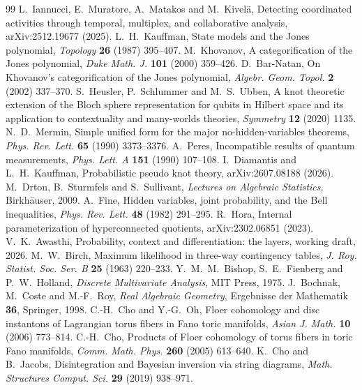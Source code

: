 \documentclass[11pt]{article}
\theoremstyle{definition}\newtheorem{definition}[theorem]{Definition}\newtheorem{remark}[theorem]{Remark}\newtheorem{example}[theorem]{Example}\newtheorem{problem}[theorem]{Open problem}\crefname{problem}{Problem}{Problems}
\begin{document}
\begin{thebibliography}{99}
 L.~Iannucci, E.~Muratore, A.~Matakos and M.~Kivel\"a, Detecting coordinated activities through temporal, multiplex, and collaborative analysis, arXiv:2512.19677 (2025).
 L.~H.~Kauffman, State models and the Jones polynomial, \emph{Topology} \textbf{26} (1987) 395--407.
 M.~Khovanov, A categorification of the Jones polynomial, \emph{Duke Math. J.} \textbf{101} (2000) 359--426.
 D.~Bar-Natan, On Khovanov's categorification of the Jones polynomial, \emph{Algebr. Geom. Topol.} \textbf{2} (2002) 337--370.
 S.~Heusler, P.~Schlummer and M.~S.~Ubben, A knot theoretic extension of the Bloch sphere representation for qubits in Hilbert space and its application to contextuality and many-worlds theories, \emph{Symmetry} \textbf{12} (2020) 1135.
 N.~D.~Mermin, Simple unified form for the major no-hidden-variables theorems, \emph{Phys. Rev. Lett.} \textbf{65} (1990) 3373--3376.
 A.~Peres, Incompatible results of quantum measurements, \emph{Phys. Lett. A} \textbf{151} (1990) 107--108.
 I.~Diamantis and L.~H.~Kauffman, Probabilistic pseudo knot theory, arXiv:2607.08188 (2026).
 M.~Drton, B.~Sturmfels and S.~Sullivant, \emph{Lectures on Algebraic Statistics}, Birkh\"auser, 2009.
 A.~Fine, Hidden variables, joint probability, and the Bell inequalities, \emph{Phys. Rev. Lett.} \textbf{48} (1982) 291--295.
 R.~Hora, Internal parameterization of hyperconnected quotients, arXiv:2302.06851 (2023).
 V.~K.~Awasthi, Probability, context and differentiation: the layers, working draft, 2026.
 M.~W.~Birch, Maximum likelihood in three-way contingency tables, \emph{J. Roy. Statist. Soc. Ser. B} \textbf{25} (1963) 220--233.
 Y.~M.~M.~Bishop, S.~E.~Fienberg and P.~W.~Holland, \emph{Discrete Multivariate Analysis}, MIT Press, 1975.
 J.~Bochnak, M.~Coste and M.-F.~Roy, \emph{Real Algebraic Geometry}, Ergebnisse der Mathematik \textbf{36}, Springer, 1998.
 C.-H.~Cho and Y.-G.~Oh, Floer cohomology and disc instantons of Lagrangian torus fibers in Fano toric manifolds, \emph{Asian J. Math.} \textbf{10} (2006) 773--814.
 C.-H.~Cho, Products of Floer cohomology of torus fibers in toric Fano manifolds, \emph{Comm. Math. Phys.} \textbf{260} (2005) 613--640.
 K.~Cho and B.~Jacobs, Disintegration and Bayesian inversion via string diagrams, \emph{Math. Structures Comput. Sci.} \textbf{29} (2019) 938--971.

\end{thebibliography}
\end{document}
